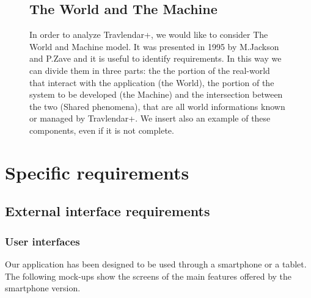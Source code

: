 \documentclass[12pt,titlepage]{article}
\begin{document}
\begin{figure}
\subsection{The World and The Machine}\label{sec:mod1}
\begin{flushleft}
In order to analyze Travlendar+, we would like to consider The World and Machine model. It was presented in 1995 by M.Jackson and P.Zave and it is useful to identify requirements. In this way we can divide them in three parts: the the portion of the real-world that interact with the application (the World), the portion of the system to be developed (the Machine) and the intersection between the two (Shared phenomena), that are all world informations known or managed by Travlendar+.
We insert also an example of these components, even if it is not complete.
\end{flushleft}

\centering
{}
\end{figure}

\pagebreak
\section{Specific requirements}\label{sec:crit}

\subsection{External interface requirements}\label{sec:mod1}
\subsubsection{User interfaces}\label{sec:mod1}
Our application has been designed to be used through a smartphone or a tablet.
The following mock-ups show the screens of the main features offered by the smartphone version. 
\end{document}
